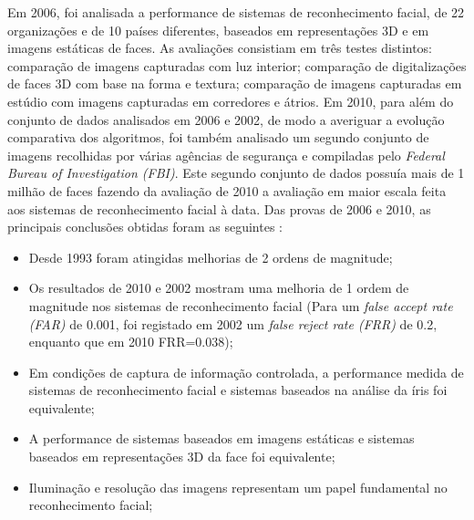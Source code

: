 Em 2006, foi analisada a performance de sistemas de reconhecimento facial, de 22 organizações e de 10 países diferentes, baseados em representações 3D e em imagens estáticas de faces. As avaliações consistiam em três testes distintos: comparação de imagens capturadas com luz interior; comparação de digitalizações de faces 3D com base na forma e textura; comparação de imagens capturadas em estúdio com imagens capturadas em corredores e átrios. Em 2010, para além do conjunto de dados analisados em 2006 e 2002, de modo a averiguar a evolução comparativa dos algoritmos, foi também analisado um segundo conjunto de imagens recolhidas por várias agências de segurança e compiladas pelo \textit{Federal Bureau of Investigation (FBI)}. Este segundo conjunto de dados possuía mais de 1 milhão de faces fazendo da avaliação de 2010 a avaliação em maior escala feita aos sistemas de reconhecimento facial à data. Das provas de 2006 e 2010, as principais conclusões obtidas foram as seguintes \cite{Phillips2007, Grother2010, Chellappa2010, Li2011}:
\begin{itemize}
\item Desde 1993 foram atingidas melhorias de 2 ordens de magnitude;
\item Os resultados de 2010 e 2002 mostram uma melhoria de 1 ordem de magnitude nos sistemas de reconhecimento facial (Para um \textit{false accept rate (FAR)} de 0.001, foi registado em 2002 um \textit{false reject rate (FRR)} de 0.2, enquanto que em 2010 FRR=0.038);
\item Em condições de captura de informação controlada, a performance medida de sistemas de reconhecimento facial e sistemas baseados na análise da íris foi equivalente;
\item A performance de sistemas baseados em imagens estáticas e sistemas baseados em representações 3D da face foi equivalente;
\item Iluminação e resolução das imagens representam um papel fundamental no reconhecimento facial;
\end{itemize}
